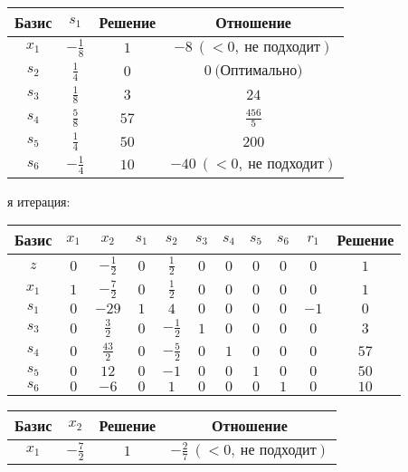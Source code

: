 \documentclass{article}%
\begin{document}
\begin{flushleft}
\newline%
\newline%
\newline%
\begin{tabular}{|cccc|}%
\hline%
Базис&$s_{1}$&Решение&Отношение\\%
\hline%
$x_{1}$&$-\frac{1}{8}$&$1$&$-8\: (< 0, \: \text{не подходит})$\\%
$s_{2}$&$\frac{1}{4}$&$0$&$0\: \text{(Оптимально)}$\\%
$s_{3}$&$\frac{1}{8}$&$3$&$24$\\%
$s_{4}$&$\frac{5}{8}$&$57$&$\frac{456}{5}$\\%
$s_{5}$&$\frac{1}{4}$&$50$&$200$\\%
$s_{6}$&$-\frac{1}{4}$&$10$&$-40\: (< 0, \: \text{не подходит})$\\%
\hline%
\end{tabular}%
\newline%
\newline%
я итерация: %
\newline%
\newline%
\renewcommand{\arraystretch}{1.3}%
\begin{tabular}{|c|ccccccccc|c|}%
\hline%
Базис&$x_{1}$&$x_{2}$&$s_{1}$&$s_{2}$&$s_{3}$&$s_{4}$&$s_{5}$&$s_{6}$&$r_{1}$&Решение\\%
\hline%
$z$&$0$&$-\frac{1}{2}$&$0$&$\frac{1}{2}$&$0$&$0$&$0$&$0$&$0$&$1$\\%
\hline%
$x_{1}$&$1$&$-\frac{7}{2}$&$0$&$\frac{1}{2}$&$0$&$0$&$0$&$0$&$0$&$1$\\%
$s_{1}$&$0$&$-29$&$1$&$4$&$0$&$0$&$0$&$0$&$-1$&$0$\\%
$s_{3}$&$0$&$\frac{3}{2}$&$0$&$-\frac{1}{2}$&$1$&$0$&$0$&$0$&$0$&$3$\\%
$s_{4}$&$0$&$\frac{43}{2}$&$0$&$-\frac{5}{2}$&$0$&$1$&$0$&$0$&$0$&$57$\\%
$s_{5}$&$0$&$12$&$0$&$-1$&$0$&$0$&$1$&$0$&$0$&$50$\\%
$s_{6}$&$0$&$-6$&$0$&$1$&$0$&$0$&$0$&$1$&$0$&$10$\\%
\hline%
\end{tabular}%
\newline%
\newline%
\newline%
\begin{tabular}{|cccc|}%
\hline%
Базис&$x_{2}$&Решение&Отношение\\%
\hline%
$x_{1}$&$-\frac{7}{2}$&$1$&$-\frac{2}{7}\: (< 0, \: \text{не подходит})$\\%

\end{tabular}
\end{flushleft}
\end{document}

